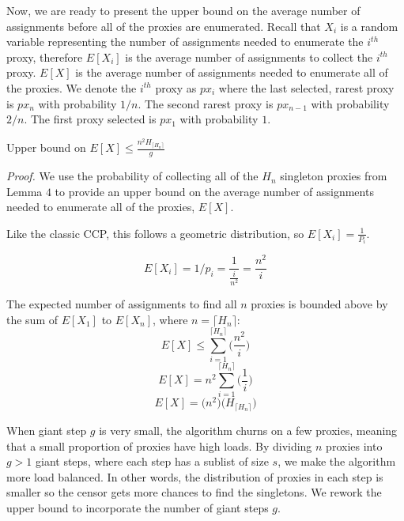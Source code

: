 Now, we are ready to present the upper bound on the average number of assignments before all of the proxies are enumerated. Recall that $X_i$ is a random variable representing the number of assignments needed to enumerate the $i^{th}$ proxy, therefore $E[X_i]$ is the average number of assignments to collect the $i^{th}$ proxy. $E[X]$ is the average number of assignments needed to enumerate all of the proxies. We denote the $i^{th}$ proxy as $px_i$ where the last selected, rarest proxy is $px_{n}$ with probability $1/n$. The second rarest proxy is $px_{n-1}$ with probability $2/n$. The first proxy selected is $px_1$ with probability $1$.\\
 
\label{theorem:UBEX}
\begin{theorem} {Upper bound on $E[X] \leq \frac{n^2H_{\lceil{H_n}\rceil}}{g}$} 
\end{theorem}

\emph{Proof.} We use the probability of collecting all of the $H_n$ singleton proxies from Lemma $4$ to provide an upper bound on the average number of assignments needed to enumerate all of the proxies, $E[X]$. 

Like the classic CCP, this follows a geometric distribution, so $E[X_i] =\frac{1}{P_i}$. 

$$E[X_i] = 1/p_i = \frac{1}{\frac{i}{n^2}} = \frac{n^2}{i}$$

The expected number of assignments to find all $n$ proxies is bounded above by the sum of $E[X_1]$ to $E[X_n]$, where $n=\lceil{H_n}\rceil$:\\

$$E[X] \leq \sum_{i=1}^{\lceil{H_n}\rceil} \bigg(\frac{n^2}{i}\bigg)$$
$$E[X] = n^2 \sum_{i=1}^{\lceil{H_n}\rceil} \bigg(\frac{1}{i}\bigg)$$
$$E[X] = \bigg(n^2\bigg) \bigg(H_{\lceil{H_n}\rceil}\bigg)$$

When giant step $g$ is very small, the algorithm churns on a few proxies, meaning that a small proportion of proxies have high loads. By dividing $n$ proxies into $g>1$ giant steps, where each step has a sublist of size $s$, we make the algorithm more load balanced. In other words, the distribution of proxies in each step is smaller so the censor gets more chances to find the singletons.  We rework the upper bound to incorporate the number of giant steps $g$.

